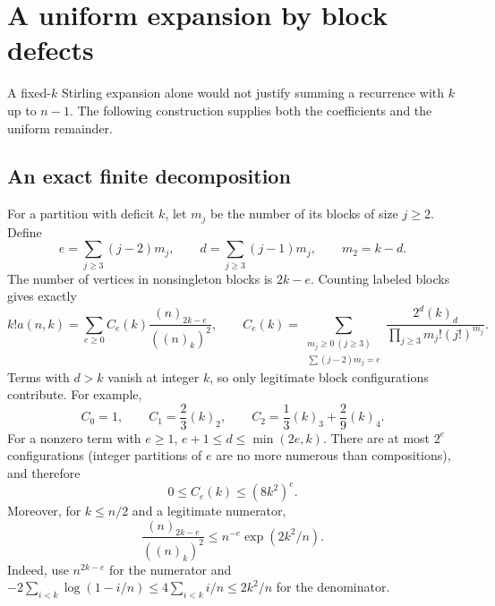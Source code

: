 \documentclass[11pt,letterpaper]{article}
\theoremstyle{definition}\newtheorem{definition}[theorem]{Definition}
\theoremstyle{remark}\newtheorem{remark}[theorem]{Remark}
\newcommand{\fall}[2]{(#1)_{#2}}
\begin{document}
\section{A uniform expansion by block defects}\label{spc:sec:kernel}
A fixed-$k$ Stirling expansion alone would not justify summing a recurrence with $k$ up to $n-1$. The following construction supplies both the coefficients and the uniform remainder.

\subsection{An exact finite decomposition}
For a partition with deficit $k$, let $m_j$ be the number of its blocks of size $j\ge2$. Define
\[
 e=\sum_{j\ge3}(j-2)m_j,\qquad
 d=\sum_{j\ge3}(j-1)m_j,\qquad m_2=k-d.
\]
The number of vertices in nonsingleton blocks is $2k-e$. Counting labeled blocks gives exactly
\begin{equation}\label{spc:eq:block}
 k!a(n,k)=\sum_{e\ge0}C_e(k)\frac{\fall n{2k-e}}{(\fall nk)^2},
 \qquad
 C_e(k)=\sum_{\substack{m_j\ge0\ (j\ge3)\\\sum(j-2)m_j=e}}
 \frac{2^d\fall kd}{\prod_{j\ge3}m_j!(j!)^{m_j}}.
\end{equation}
Terms with $d>k$ vanish at integer $k$, so only legitimate block configurations contribute. For example,
\[
 C_0=1,\qquad C_1=\frac23\fall k2,\qquad
 C_2=\frac13\fall k3+\frac29\fall k4.
\]
For a nonzero term with $e\ge1$, $e+1\le d\le\min(2e,k)$. There are at most $2^e$ configurations (integer partitions of $e$ are no more numerous than compositions), and therefore
\begin{equation}\label{spc:eq:Ce}
 0\le C_e(k)\le(8k^2)^e.
\end{equation}
Moreover, for $k\le n/2$ and a legitimate numerator,
\begin{equation}\label{spc:eq:blockbound}
 \frac{\fall n{2k-e}}{(\fall nk)^2}
 \le n^{-e}\exp(2k^2/n).
\end{equation}
Indeed, use $n^{2k-e}$ for the numerator and
$-2\sum_{i<k}\log(1-i/n)\le4\sum_{i<k}i/n\le2k^2/n$
for the denominator.
\end{document}
